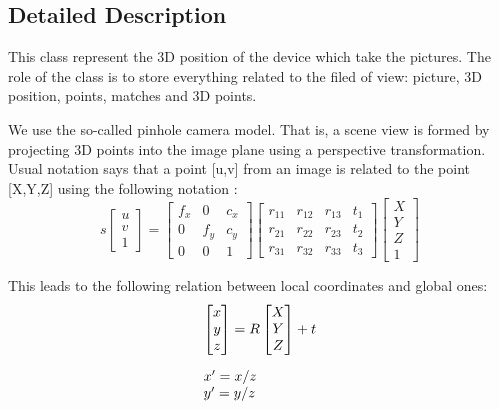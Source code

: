 \subsection{Detailed Description}
This class represent the 3D position of the device which take the pictures. The role of the class is to store everything related to the filed of view: picture, 3D position, points, matches and 3D points. 

We use the so-\/called pinhole camera model. That is, a scene view is formed by projecting 3D points into the image plane using a perspective transformation. Usual notation says that a point \mbox{[}u,v\mbox{]} from an image is related to the point \mbox{[}X,Y,Z\mbox{]} using the following notation : \[ s \begin{bmatrix} u \\ v \\ 1 \end{bmatrix} = \begin{bmatrix}f_x & 0 & c_x \\ 0 & f_y & c_y \\ 0 & 0 & 1 \end{bmatrix} \begin{bmatrix} r_{11} & r_{12} & r_{13} & t_1 \\ r_{21} & r_{22} & r_{23} & t_2 \\ r_{31} & r_{32} & r_{33} & t_3 \end{bmatrix} \begin{bmatrix} X \\ Y \\ Z \\ 1 \end{bmatrix} \]

This leads to the following relation between local coordinates and global ones: \[ \begin{array}{l} \vspace{10pt} \begin{bmatrix} x \\ y \\ z \end{bmatrix} = R \begin{bmatrix} X \\ Y \\ Z \end{bmatrix} + t \\ x' = x/z \\ y' = y/z \vspace{10pt} \end{array} \] 

